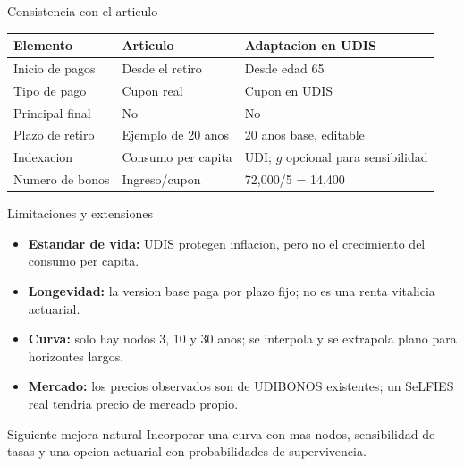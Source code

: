 \documentclass[aspectratio=169,11pt]{beamer}
\begin{document}
\begin{frame}{Consistencia con el articulo}
  \begin{table}
  \centering
  \small
  \begin{tabular}{p{}p{}p{}}
    \toprule
    Elemento & Articulo & Adaptacion en UDIS \\
    \midrule
    Inicio de pagos & Desde el retiro & Desde edad 65 \\
    Tipo de pago & Cupon real & Cupon en UDIS \\
    Principal final & No & No \\
    Plazo de retiro & Ejemplo de 20 anos & 20 anos base, editable \\
    Indexacion & Consumo per capita & UDI; $g$ opcional para sensibilidad \\
    Numero de bonos & Ingreso/cupon & 72,000/5 = 14,400 \\
    \bottomrule
  \end{tabular}
  \end{table}
\end{frame}

\begin{frame}{Limitaciones y extensiones}
  \begin{itemize}
    \item \textbf{Estandar de vida:} UDIS protegen inflacion, pero no el crecimiento del consumo per capita.
    \item \textbf{Longevidad:} la version base paga por plazo fijo; no es una renta vitalicia actuarial.
    \item \textbf{Curva:} solo hay nodos 3, 10 y 30 anos; se interpola y se extrapola plano para horizontes largos.
    \item \textbf{Mercado:} los precios observados son de UDIBONOS existentes; un SeLFIES real tendria precio de mercado propio.
  \end{itemize}
  \vspace{0.2cm}
  \begin{block}{Siguiente mejora natural}
    Incorporar una curva con mas nodos, sensibilidad de tasas y una opcion actuarial con probabilidades de supervivencia.
  \end{block}
\end{frame}
\end{document}
